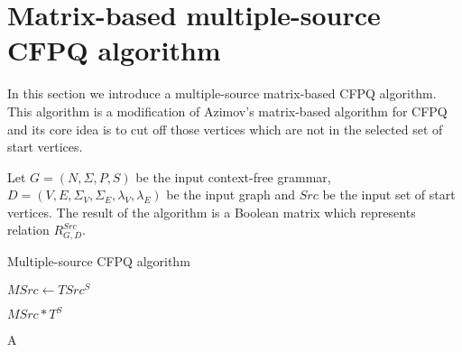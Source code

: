 \section{Matrix-based multiple-source CFPQ algorithm}
\label{sec:multiple-source-algo}

 In this section we introduce a multiple-source matrix-based CFPQ algorithm.
 This algorithm is a modification of Azimov's matrix-based algorithm for CFPQ and its core idea is to cut off those vertices which are not in the selected set of start vertices.


Let $G = (N, \Sigma, P, S)$ be the input context-free grammar, $D = (V, E, \Sigma_V, \Sigma_E, \lambda_V, \lambda_E)$ be the input graph and $Src$ be the input set of start vertices.
The result of the algorithm is a Boolean matrix which represents relation $R_{G,D}^{Src}$.

\begin{algorithm}
\small
\begin{algorithmic}[1]
\caption{Multiple-source CFPQ algorithm}
\label{alg:algo1}


     
    \EndFor

    \State $MSrc \gets TSrc^S$

     
        \EndFor
    \EndFor

        \EndFor
    \EndFor

     
        \EndFor
    \EndWhile
    \State \Return $MSrc * T^S$
\EndFunction

    \EndFor
    \State \Return A
\EndFunction
\end{algorithmic}
\end{algorithm}

